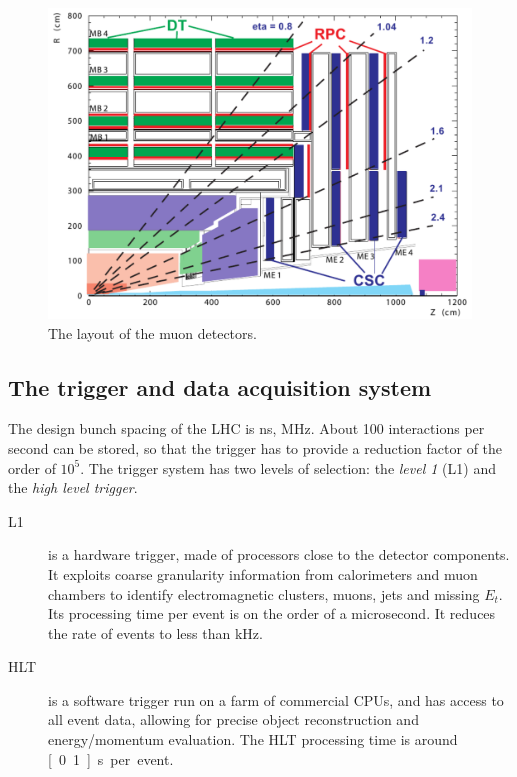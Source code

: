 \begin{figure}[htb]
    \centering
    \includegraphics[width=\textwidth]{images/pdf/cms_muon_system}

    \caption{The layout of the muon detectors.}
    \label{fig:cms_muon_system}
\end{figure}

\subsection{The trigger and data acquisition system}
The design bunch spacing of the LHC is \unit[25]{ns}, \ie
\unit[40]{MHz}. About 100 interactions per second can be stored, so that
the trigger has to provide a reduction factor of the order of $10^{5}$.
The trigger system has two levels of selection: the \emph{level 1} (L1) and
the \emph{high level trigger}.
\begin{description}
    \item[L1] is a hardware trigger, made of processors close to the
        detector components. It exploits coarse granularity information from
        calorimeters and muon chambers to identify electromagnetic clusters,
        muons, jets and missing $E_t$. Its processing time per event is on
        the order of a microsecond. It reduces the rate of events to less
        than \unit[100]{kHz}.
    \item[HLT] is a software trigger run on a farm of commercial CPUs,
        and has access to all event data, allowing for precise object
        reconstruction and energy/momentum evaluation. The HLT processing
        time is around \unit[0.1]{s} per event.
\end{description}
